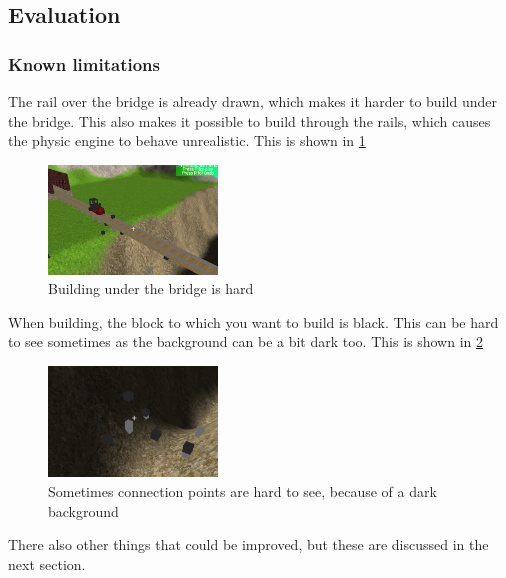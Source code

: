 \subsection{Evaluation}
\subsubsection{Known limitations}
The rail over the bridge is already drawn, which makes it harder to build under the bridge. This also makes it possible to build through the rails, which causes the physic engine to behave unrealistic. This is shown in \ref{fig:limit1}
\begin{figure}[H]
    \centering
    \includegraphics[width=0.4\textwidth]{screenshots/limit1.png}
    \caption{Building under the bridge is hard}
    \label{fig:limit1}
\end{figure}
When building, the block to which you want to build is black. This can be hard to see sometimes as the background can be a bit dark too. This is shown in \ref{fig:limit2}
\begin{figure}[H]
    \centering
    \includegraphics[width=0.4\textwidth]{screenshots/limi2.png}
    \caption{Sometimes connection points are hard to see, because of a dark background}
    \label{fig:limit2}
\end{figure}
There also other things that could be improved, but these are discussed in the next section.